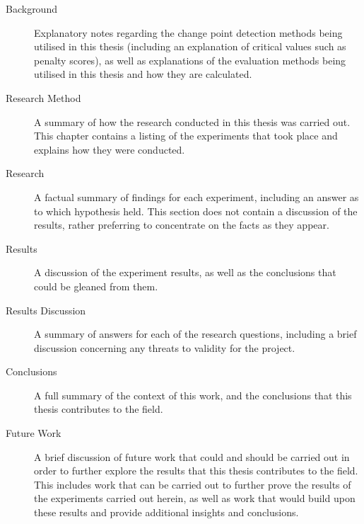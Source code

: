 \documentclass[../main.tex]{subfiles}
\begin{document}
\begin{description}
    \item[Background] Explanatory notes regarding the change point detection methods being utilised in this thesis (including an explanation of critical values such as penalty scores), as well as explanations of the evaluation methods being utilised in this thesis and how they are calculated.
    \item[Research Method] A summary of how the research conducted in this thesis was carried out. This chapter contains a listing of the experiments that took place and explains how they were conducted.
    \item[Research] A factual summary of findings for each experiment, including an answer as to which hypothesis held. This section does not contain a discussion of the results, rather preferring to concentrate on the facts as they appear.
    \item[Results] A discussion of the experiment results, as well as the conclusions that could be gleaned from them.
    \item[Results Discussion] A summary of answers for each of the research questions, including a brief discussion concerning any threats to validity for the project.
    \item[Conclusions] A full summary of the context of this work, and the conclusions that this thesis contributes to the field.
    \item[Future Work] A brief discussion of future work that could and should be carried out in order to further explore the results that this thesis contributes to the field. This includes work that can be carried out to further prove the results of the experiments carried out herein, as well as work that would build upon these results and provide additional insights and conclusions.
\end{description}
\end{document}
